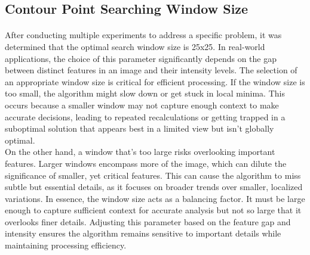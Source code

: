 \documentclass[12pt,a4paper]{report}
\begin{document}
\subsection{Contour Point Searching Window Size}
\paragraph*{}
After conducting multiple experiments to address a specific problem, it was determined that the optimal search window size is 25x25. In real-world applications, the choice of this parameter significantly depends on the gap between distinct features in an image and their intensity levels. The selection of an appropriate window size is critical for efficient processing. If the window size is too small, the algorithm might slow down or get stuck in local minima. This occurs because a smaller window may not capture enough context to make accurate decisions, leading to repeated recalculations or getting trapped in a suboptimal solution that appears best in a limited view but isn't globally optimal.\\
On the other hand, a window that's too large risks overlooking important features. Larger windows encompass more of the image, which can dilute the significance of smaller, yet critical features. This can cause the algorithm to miss subtle but essential details, as it focuses on broader trends over smaller, localized variations. In essence, the window size acts as a balancing factor. It must be large enough to capture sufficient context for accurate analysis but not so large that it overlooks finer details. Adjusting this parameter based on the feature gap and intensity ensures the algorithm remains sensitive to important details while maintaining processing efficiency.



\end{document}
